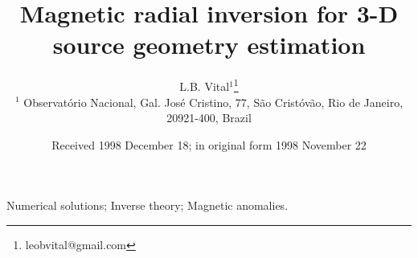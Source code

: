 \documentclass[extra,mreferee]{gji}
\title[Geophys.\ J.\ Int.: Magnetic radial inversion]
  {Magnetic radial inversion for 3-D source geometry estimation}
\author[L.B. Vital, V.C. Oliveira Jr., V.C.F. Barbosa]
  {L.B. Vital$^1$\thanks{leobvital@gmail.com}\\
  $^1$ Observat{\'o}rio Nacional, Gal. Jos{\'e} Cristino, 77, São Crist{\'o}v{\~a}o,
  Rio de Janeiro, 20921-400, Brazil
  }
\date{Received 1998 December 18; in original form 1998 November 22}
\begin{document}
\label{firstpage}

\maketitle



\begin{keywords}
 Numerical solutions; Inverse theory; Magnetic anomalies.
\end{keywords}











\begin{acknowledgments}
\end{acknowledgments}






\appendix

\label{lastpage}
\end{document}
